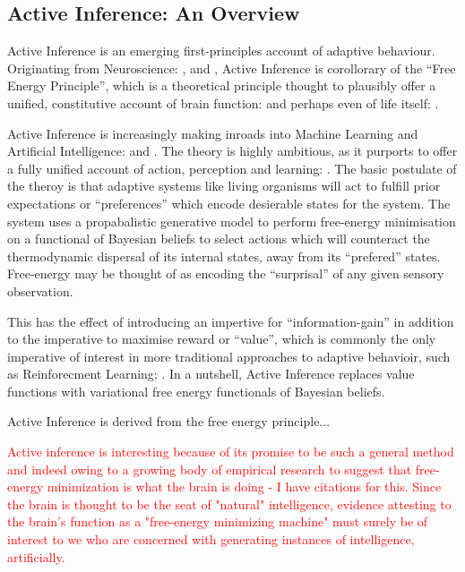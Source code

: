 \documentclass[12pt, oneside]{article}
\begin{document}
\subsection{Active Inference: An Overview}

Active Inference is an emerging first-principles account of adaptive behaviour. Originating from Neuroscience: \textcite{A_FEP_For_The_Brain}, \textcite{The-Bayesian-Brain} and \textcite{Action-Behaviour-FE}, Active Inference is corollorary of the ``Free Energy Principle'', which is a theoretical principle thought to plausibly offer a unified, constitutive account of brain function: \textcite{FEP-Rough-Guide-Brain} and perhaps even of life itself: \textcite{Life-As-We-Know-It}. 

Active Inference is increasingly making inroads into Machine Learning and Artificial Intelligence: \textcite{RL-or-AIF} and \textcite{Applications-of-FEP-Machine-Learning-Neuroscience}. The theory is highly ambitious, as it purports to offer a fully unified account of action, perception and learning: \textcite{FEP-Unified-Brain-Theory}. The basic postulate of the theroy is that adaptive systems like living organisms will act to fulfill prior expectations or ``preferences'' which encode desierable states for the system. The system uses a propabalistic generative model to perform free-energy minimisation on a functional of Bayesian beliefs to select actions which will counteract the thermodynamic dispersal of its internal states, away from its ``prefered'' states. Free-energy may be thought of as encoding the ``surprisal'' of any given sensory observation. 

This has the effect of introducing an impertive for ``information-gain'' in addition to the imperative to maximise reward or ``value'', which is commonly the only imperative of interest in more traditional approaches to adaptive behavioir, such as Reinforecment Learning; \textcite{Reinforcement-Learning-An-Introduction}. In a nutshell, Active Inference replaces value functions with variational free energy functionals of Bayesian beliefs.  

Active Inference is derived from the free energy principle...

\textcolor{red}{Active inference is interesting because of its promise to be such a general method and indeed owing to a growing body of empirical research to suggest that free-energy minimization is what the brain is doing - I have citations for this. Since the brain is thought to be the seat of "natural" intelligence, evidence attesting to the brain's function as a "free-energy minimizing machine" must surely be of interest to we who are concerned with generating instances of intelligence, artificially.}
\end{document}
